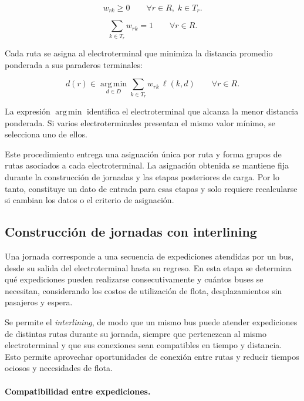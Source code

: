 \begin{equation}
    w_{rk} \geq 0
    \qquad \forall r \in R,\; k \in T_r.
\end{equation}

\begin{equation}
    \sum_{k \in T_r} w_{rk} = 1
    \qquad \forall r \in R.
\end{equation}

Cada ruta se asigna al electroterminal que minimiza la distancia promedio
ponderada a sus paraderos terminales:

\begin{equation}
    d(r) \in
    \operatorname*{arg\,min}_{d \in D}
    \sum_{k \in T_r} w_{rk}\,\ell(k,d)
    \qquad \forall r \in R.
\end{equation}

La expresión $\operatorname*{arg\,min}$ identifica el electroterminal
que alcanza la menor distancia ponderada. Si varios electroterminales
presentan el mismo valor mínimo, se selecciona uno de ellos.

Este procedimiento entrega una asignación única por ruta y forma grupos
de rutas asociados a cada electroterminal. La asignación obtenida se
mantiene fija durante la construcción de jornadas y las etapas posteriores
de carga. Por lo tanto, constituye un dato de entrada para esas etapas
y solo requiere recalcularse si cambian los datos o el criterio de asignación.

\subsection{Construcción de jornadas con interlining}

Una jornada corresponde a una secuencia de expediciones atendidas por
un bus, desde su salida del electroterminal hasta su regreso. En esta
etapa se determina qué expediciones pueden realizarse consecutivamente
y cuántos buses se necesitan, considerando los costos de utilización
de flota, desplazamientos sin pasajeros y espera.

Se permite el \textit{interlining}, de modo que un mismo bus puede atender
expediciones de distintas rutas durante su jornada, siempre que
pertenezcan al mismo electroterminal y que sus conexiones sean compatibles
en tiempo y distancia. Esto permite aprovechar oportunidades de conexión
entre rutas y reducir tiempos ociosos y necesidades de flota.

\paragraph{Compatibilidad entre expediciones.}

